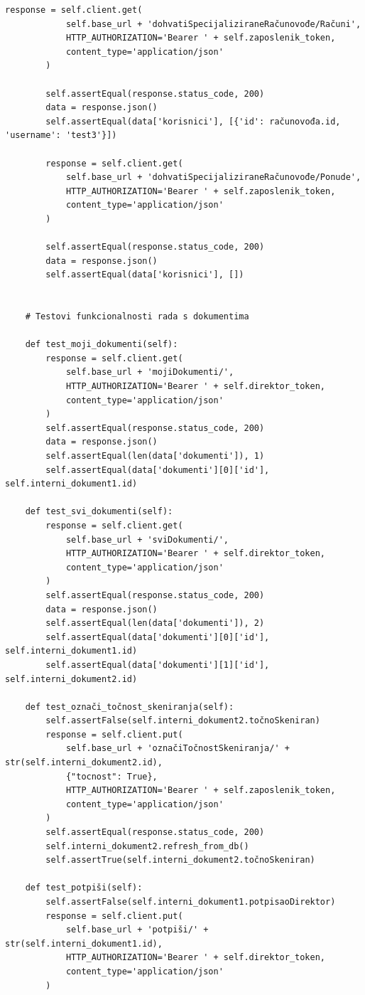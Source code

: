 \begin{lstlisting}[breaklines=true]
		response = self.client.get(
			self.base_url + 'dohvatiSpecijaliziraneRačunovođe/Računi',
			HTTP_AUTHORIZATION='Bearer ' + self.zaposlenik_token,
			content_type='application/json'
		)
		
		self.assertEqual(response.status_code, 200)
		data = response.json()
		self.assertEqual(data['korisnici'], [{'id': računovođa.id, 'username': 'test3'}])
		
		response = self.client.get(
			self.base_url + 'dohvatiSpecijaliziraneRačunovođe/Ponude',
			HTTP_AUTHORIZATION='Bearer ' + self.zaposlenik_token,
			content_type='application/json'
		)
		
		self.assertEqual(response.status_code, 200)
		data = response.json()
		self.assertEqual(data['korisnici'], [])
		
		
	# Testovi funkcionalnosti rada s dokumentima
	
	def test_moji_dokumenti(self):
		response = self.client.get(
			self.base_url + 'mojiDokumenti/',
			HTTP_AUTHORIZATION='Bearer ' + self.direktor_token,
			content_type='application/json'
		)
		self.assertEqual(response.status_code, 200)
		data = response.json()
		self.assertEqual(len(data['dokumenti']), 1)
		self.assertEqual(data['dokumenti'][0]['id'], self.interni_dokument1.id)
		
	def test_svi_dokumenti(self):
		response = self.client.get(
			self.base_url + 'sviDokumenti/',
			HTTP_AUTHORIZATION='Bearer ' + self.direktor_token,
			content_type='application/json'
		)
		self.assertEqual(response.status_code, 200)
		data = response.json()
		self.assertEqual(len(data['dokumenti']), 2)
		self.assertEqual(data['dokumenti'][0]['id'], self.interni_dokument1.id)
		self.assertEqual(data['dokumenti'][1]['id'], self.interni_dokument2.id)

	def test_označi_točnost_skeniranja(self):
		self.assertFalse(self.interni_dokument2.točnoSkeniran)
		response = self.client.put(
			self.base_url + 'označiTočnostSkeniranja/' + str(self.interni_dokument2.id),
			{"tocnost": True},
			HTTP_AUTHORIZATION='Bearer ' + self.zaposlenik_token,
			content_type='application/json'
		)
		self.assertEqual(response.status_code, 200)
		self.interni_dokument2.refresh_from_db()
		self.assertTrue(self.interni_dokument2.točnoSkeniran)
		
	def test_potpiši(self):
		self.assertFalse(self.interni_dokument1.potpisaoDirektor)
		response = self.client.put(
			self.base_url + 'potpiši/' + str(self.interni_dokument1.id),
			HTTP_AUTHORIZATION='Bearer ' + self.direktor_token,
			content_type='application/json'
		)
		

\end{lstlisting}
